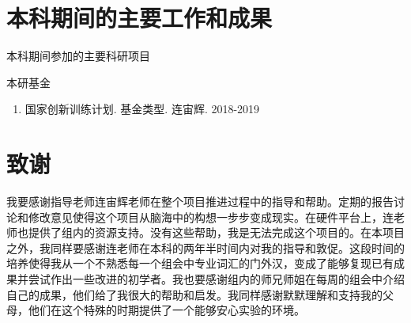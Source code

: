 \documentclass[UTF8,openany,AutoFakeBold,AutoFakeSlant,cs4size]{ctexbook}
\begin{document}
\clearpage


\linespread{1}\selectfont
\normalsize
\chapter*{本科期间的主要工作和成果}

\noindent 本科期间参加的主要科研项目

\noindent 本研基金
\begin{enumerate}
	\item 国家创新训练计划. 基金类型. 连宙辉. 2018-2019
\end{enumerate}



{
	\fancyhf{}
	\fancyfoot[CO,CE]{~\thepage~}
	\renewcommand{\headrulewidth}{0.7pt}
	\renewcommand{\footrulewidth}{0pt}
}
\fancyhf{}
\fancyfoot[CO,CE]{~\thepage~}
\renewcommand{\headrulewidth}{0.7pt}
\renewcommand{\footrulewidth}{0pt}
\clearpage





\linespread{1.5}\selectfont
\normalsize
\chapter*{致谢}

我要感谢指导老师连宙辉老师在整个项目推进过程中的指导和帮助。定期的报告讨论和修改意见使得这个项目从脑海中的构想一步步变成现实。在硬件平台上，连老师也提供了组内的资源支持。没有这些帮助，我是无法完成这个项目的。在本项目之外，我同样要感谢连老师在本科的两年半时间内对我的指导和敦促。这段时间的培养使得我从一个不熟悉每一个组会中专业词汇的门外汉，变成了能够复现已有成果并尝试作出一些改进的初学者。我也要感谢组内的师兄师姐在每周的组会中介绍自己的成果，他们给了我很大的帮助和启发。我同样感谢默默理解和支持我的父母，他们在这个特殊的时期提供了一个能够安心实验的环境。

{
	\fancyhf{}
	\fancyfoot[CO,CE]{~\thepage~}
	\renewcommand{\headrulewidth}{0.7pt}
	\renewcommand{\footrulewidth}{0pt}
}
\fancyhf{}
\fancyfoot[CO,CE]{~\thepage~}
\renewcommand{\headrulewidth}{0.7pt}
\renewcommand{\footrulewidth}{0pt}
\end{document}
